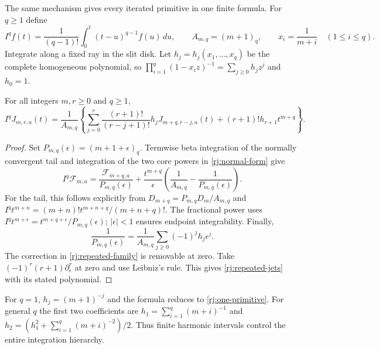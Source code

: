 The same mechanism gives every iterated primitive in one finite formula.
For $q\ge1$ define
\[
 I^qf(t)=\frac1{(q-1)!}\int_0^t(t-u)^{q-1}f(u)\,du,\qquad
 A_{m,q}=(m+1)_q,\qquad x_i=\frac1{m+i}\quad(1\le i\le q).
\]
Integrate along a fixed ray in the slit disk. Let $h_j=h_j(x_1,\ldots,x_q)$
be the complete homogeneous polynomial, so
$\prod_{i=1}^q(1-x_i z)^{-1}=\sum_{j\ge0}h_jz^j$ and $h_0=1$.

\begin{theorem}\label{rj:repeated}
For all integers $m,r\ge0$ and $q\ge1$,
\begin{equation}\label{rj:repeated-jets}
 \boxed{\displaystyle
 I^qJ_{m,r,a}(t)=\frac1{A_{m,q}}
 \left\{\sum_{j=0}^r\frac{(r+1)!}{(r-j+1)!}h_jJ_{m+q,r-j,a}(t)
           +(r+1)!h_{r+1}t^{m+q}\right\}.}
\end{equation}
\end{theorem}
\begin{proof}
Set $P_{m,q}(\epsilon)=(m+1+\epsilon)_q$. Termwise beta integration
of the normally convergent tail and integration of the two core powers
in \eqref{rj:normal-form} give
\begin{equation}\label{rj:repeated-family}
 I^q\mathcal F_{m,a}
 =\frac{\mathcal F_{m+q,a}}{P_{m,q}(\epsilon)}
 +\frac{t^{m+q}}{\epsilon}
       \left(\frac1{A_{m,q}}-\frac1{P_{m,q}(\epsilon)}\right).
\end{equation}
For the tail, this follows explicitly from
$D_{m+q}=P_{m,q}D_m/A_{m,q}$ and
$I^q t^{m+n}=(m+n)!t^{m+n+q}/(m+n+q)!$.
The fractional power uses
$I^qt^{m+\epsilon}=t^{m+q+\epsilon}/P_{m,q}(\epsilon)$;
$|\epsilon|<1$ ensures endpoint integrability. Finally,
\[
 \frac1{P_{m,q}(\epsilon)}
 =\frac1{A_{m,q}}\sum_{j\ge0}(-1)^jh_j\epsilon^j .
\]
The correction in \eqref{rj:repeated-family} is removable at zero.
Take $(-1)^r(r+1)\partial_\epsilon^r$ at zero and use Leibniz's
rule. This gives \eqref{rj:repeated-jets} with its stated polynomial.
\end{proof}

For $q=1$, $h_j=(m+1)^{-j}$ and the formula reduces to
\eqref{rj:one-primitive}. For general $q$ the first two coefficients are
$h_1=\sum_{i=1}^q(m+i)^{-1}$ and
$h_2=(h_1^2+\sum_{i=1}^q(m+i)^{-2})/2$.
Thus finite harmonic intervals control the entire integration hierarchy.

